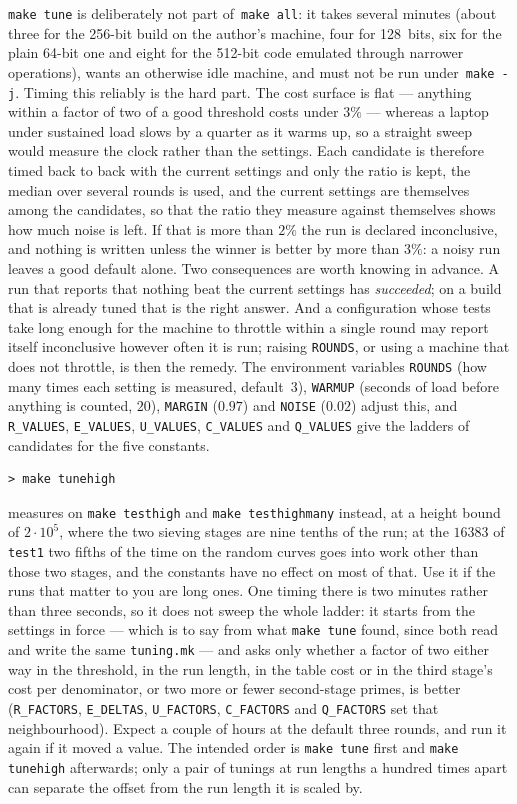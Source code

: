 \documentclass[12pt,a4paper,oneside]{amsart}
\begin{document}
\texttt{make tune} is deliberately not part of~\texttt{make all}: it takes several minutes
(about three for the 256-bit build on the author's machine, four for
128~bits, six for the plain 64-bit one and eight for the 512-bit code
emulated through narrower operations), wants an otherwise idle machine, and
must not be run under~\texttt{make -j}. Timing this reliably is the hard part.
The cost surface is flat --- anything within a factor of two of a good
threshold costs under $3\%$ --- whereas a laptop under sustained load slows by
a quarter as it warms up, so a straight sweep would measure the clock rather
than the settings. Each candidate is therefore timed back to back with the
current settings and only the ratio is kept, the median over several rounds
is used, and the current settings are themselves among the candidates, so
that the ratio they measure against themselves shows how much noise is left.
If that is more than $2\%$ the run is declared inconclusive, and nothing is
written unless the winner is better by more than $3\%$: a noisy run leaves a
good default alone. Two consequences are worth knowing in advance. A run that
reports that nothing beat the current settings has \emph{succeeded}; on a
build that is already tuned that is the right answer. And a configuration
whose tests take long enough for the machine to throttle within a single
round may report itself inconclusive however often it is run; raising
\texttt{ROUNDS}, or using a machine that does not throttle, is then the
remedy. The environment variables \texttt{ROUNDS} (how many times each
setting is measured, default~$3$), \texttt{WARMUP} (seconds of load before
anything is counted, $20$), \texttt{MARGIN} ($0.97$) and \texttt{NOISE}
($0.02$) adjust this, and \texttt{R\_VALUES}, \texttt{E\_VALUES},
\texttt{U\_VALUES}, \texttt{C\_VALUES} and \texttt{Q\_VALUES} give the
ladders of candidates for the five constants.

\begin{verbatim}
> make tunehigh
\end{verbatim}
measures on \texttt{make testhigh} and \texttt{make testhighmany} instead,
at a height bound of $2\cdot10^5$, where the two sieving stages are nine
tenths of the run; at the $16383$ of \texttt{test1} two fifths of the time on
the random curves goes into work other than those two stages, and the
constants have no effect on most of that.
Use it if the runs that matter to you are long ones. One timing there is two
minutes rather than three seconds, so it does not sweep the whole ladder: it
starts from the settings in force --- which is to say from what \texttt{make
tune} found, since both read and write the same \texttt{tuning.mk} --- and
asks only whether a factor of two either way in the threshold, in the run
length, in the table cost or in the third stage's cost per denominator, or
two more or fewer second-stage primes, is better (\texttt{R\_FACTORS},
\texttt{E\_DELTAS}, \texttt{U\_FACTORS}, \texttt{C\_FACTORS} and
\texttt{Q\_FACTORS} set that neighbourhood). Expect a couple of hours at the
default three rounds, and run it again if it moved a value. The intended
order is \texttt{make tune} first and \texttt{make tunehigh} afterwards;
only a pair of tunings at run lengths a hundred times apart can separate the
offset from the run length it is scaled by.
\end{document}

